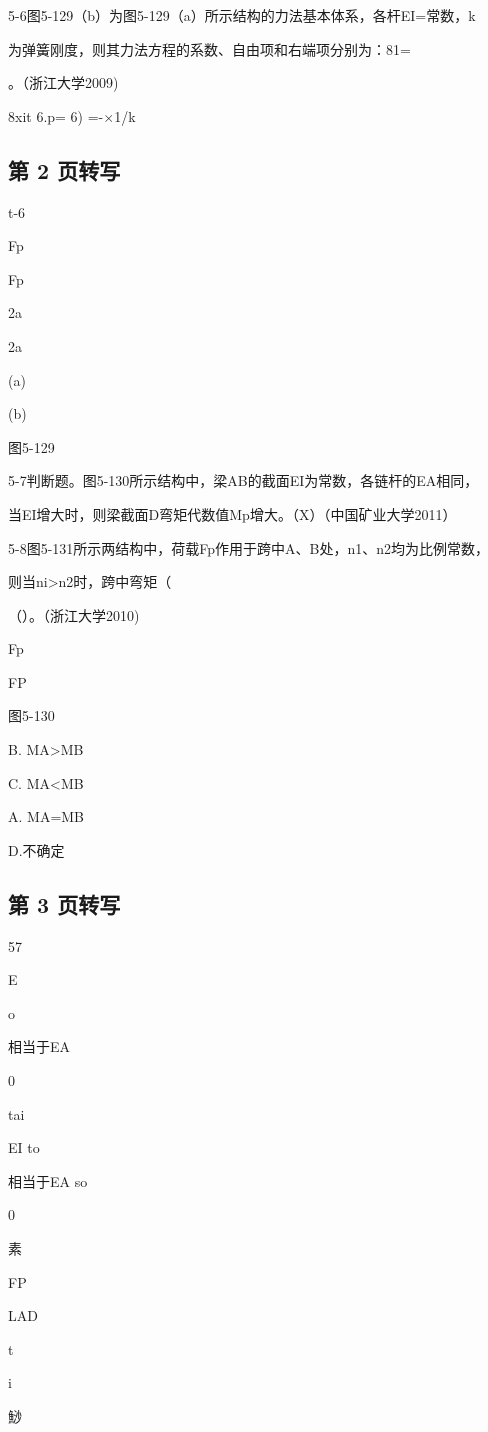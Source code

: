 5-6图5-129（b）为图5-129（a）所示结构的力法基本体系，各杆EI=常数，k

为弹簧刚度，则其力法方程的系数、自由项和右端项分别为：81=

。（浙江大学2009)

8xit 6.p= 6) =-$\times$1/k

\subsection*{第 2 页转写}
t-6

Fp

Fp

2a

2a

(a)

(b)

图5-129

5-7判断题。图5-130所示结构中，梁AB的截面EI为常数，各链杆的EA相同，

当EI增大时，则梁截面D弯矩代数值Mp增大。（X）（中国矿业大学2011）

5-8图5-131所示两结构中，荷载Fp作用于跨中A、B处，n1、n2均为比例常数，

则当ni>n2时，跨中弯矩（

（）。（浙江大学2010)

Fp

FP

图5-130

B. MA>MB

C. MA<MB

A. MA=MB

D.不确定

\subsection*{第 3 页转写}
57

E

o

相当于EA

0

tai

EI to

相当于EA so

 0

素

 FP

LAD



t

i

鯋



